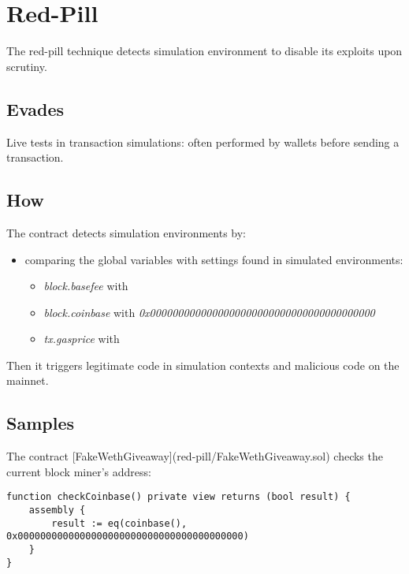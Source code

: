 \section{Red-Pill}

The red-pill technique detects simulation environment to disable its exploits upon scrutiny. 

\subsection{Evades}

Live tests in transaction simulations: often performed by wallets before sending a transaction.

\subsection{How}

The contract detects simulation environments by:

\begin{itemize}
\item{comparing the global variables with settings found in simulated environments:
\begin{itemize}
    \item{\emph{block.basefee} with}
    \item{\emph{block.coinbase} with \emph{0x0000000000000000000000000000000000000000}}
    \item{\emph{tx.gasprice} with}
\end{itemize}}
\end{itemize}

Then it triggers legitimate code in simulation contexts and malicious code on the mainnet.

\subsection{Samples}

The contract [FakeWethGiveaway](red-pill/FakeWethGiveaway.sol) checks the current block miner’s address:

\begin{highlight}
\begin{lstlisting}[language=Solidity]
function checkCoinbase() private view returns (bool result) {
    assembly {
        result := eq(coinbase(), 0x0000000000000000000000000000000000000000)
    }
}
\end{lstlisting}
\end{highlight}

